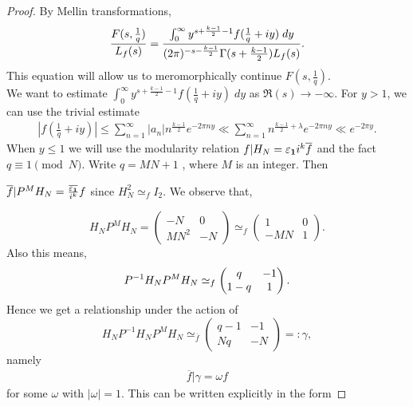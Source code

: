 \documentclass[a4paper,12.5pt]{amsart}
\theoremstyle{definition}
\theoremstyle{remark}
\newcommand{\F}{L_f}
\begin{document}
\begin{proof}

By Mellin transformations, 
\begin{equation}
{\label{Mellin transformation}} \frac{      F(s, \frac{1}{q})}{  \F(s)}= \frac{\int_{0}^{\infty} y^{s +\frac{k-1}{2} -1} f(\frac{1}{q}+iy)  \; dy}{ (2 \pi)^{-s - \frac{k-1}{2}} \Gamma(s+ \frac{k-1}{2}) \F(s) }  .    \end{equation}
This equation will allow us to meromorphically continue $F(s, \frac{1}{q})$. 
\\

We want to estimate $ \int_{0}^{\infty} y^{s +\frac{k-1}{2}-1}  f(\frac{1}{q}+iy)   \; dy$ as $\Re(s) \rightarrow - \infty$. For $y>1$, we can use the trivial estimate 
\begin{align}
    \left| f(\frac{1}{q}+iy) \right|  \leq \sum_{n=1}^{\infty} |a_n| n^{\frac{k-1}{2}} e^{- 2 \pi n y}
    \ll \sum_{n=1}^{\infty} n^{{\frac{k-1}{2}}+ \lambda} e^{-2 \pi n y} \ll e^{- 2 \pi y}.
\end{align}
 When $y \leq 1$ we will use the modularity relation $ f| H_N = \varepsilon_ {\bold{1}} i^k \overline{f}$ and the fact $q \equiv 1 \pmod{N}$. Write $q=MN+1$ ,  where $M$ is an integer. Then 

 $ \overline{ f}| P^M H_N =  \frac{ \overline{\varepsilon_{\bold{1}}}}{  i^k}  f$ since $ H_N^2 \simeq_{f} I_2$. We observe  that, 

\[H_N P^{M} H_N =   \begin{pmatrix}
-N & 0 \\
MN^2 & -N 
\end{pmatrix}  \simeq_{f}  \begin{pmatrix}
1 & 0 \\
-MN & 1 
\end{pmatrix} .   \]
Also this means, 
\begin{equation*}{\label{modular with respect to gamma_{q,1}}}
    P^{-1} H_N P^M H_N      \simeq_{f}  \begin{pmatrix}
 q & -1 \\
1-q & 1 
\end{pmatrix} .      
\end{equation*}     
Hence we  get a relationship under the action of 
\[  H_N    P^{-1} H_N P^M H_N    \simeq_{\overline{f}}   \begin{pmatrix}
q-1 & -1 \\
Nq & -N 
\end{pmatrix}=:  \gamma  ,      \]
namely 
\begin{align*}
    \overline{f}| \gamma  =  \omega f
\end{align*}
for some $ \omega$ with $|\omega|=1$. This can be written explicitly in the form 



\end{proof}
\end{document}
